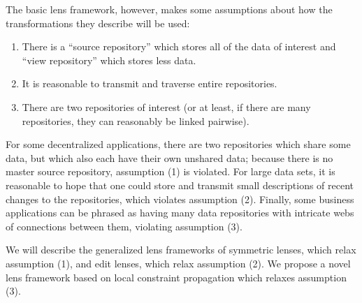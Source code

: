The basic lens framework, however, makes some assumptions about how the
transformations they describe will be used:
\begin{enumerate}
    \item There is a ``source repository'' which stores all of the data of
        interest and ``view repository'' which stores less data.
    \item It is reasonable to transmit and traverse entire repositories.
    \item There are two repositories of interest (or at least, if there are
        many repositories, they can reasonably be linked pairwise).
\end{enumerate}
For some decentralized applications, there are two repositories which share
some data, but which also each have their own unshared data; because there
is no master source repository, assumption (1) is violated. For large data
sets, it is reasonable to hope that one could store and transmit small
descriptions of recent changes to the repositories, which violates
assumption (2). Finally, some business applications can be phrased as having
many data repositories with intricate webs of connections between them,
violating assumption (3).

We will describe the generalized lens frameworks of symmetric lenses, which
relax assumption (1), and edit lenses, which relax assumption (2). We
propose a novel lens framework based on local constraint propagation which
relaxes assumption (3).

\vspace*{\fill}

\newpage

\tableofcontents

\newpage
\draftspaced
{}

